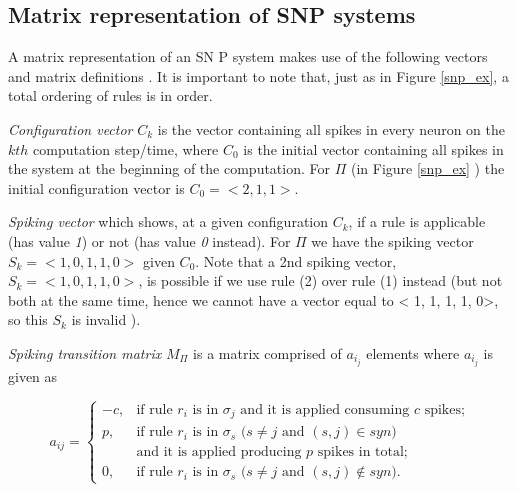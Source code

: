 \documentclass{acm_proc_article-sp}
\begin{document}




\subsection{Matrix representation of SNP systems}
A matrix representation of an SN P system makes use of the
following vectors and matrix definitions \cite{snpbrain}\cite{snpmat} . It is important to note that, just as in Figure \ref{snp_ex}, a total ordering of rules is in
order.

\textit{Configuration vector} $C_k$ is the vector containing all spikes in every neuron on the $kth$ computation step/time, where $C_0$ is the initial vector containing all spikes in the system at the beginning of the computation. For $\Pi$ (in Figure \ref{snp_ex} ) the initial configuration vector is $C_0 = < 2, 1, 1 >$.

\textit{Spiking vector} which shows, at a given configuration $C_k$, if a
rule is applicable (has value \textit{1}) or not (has value \textit{0} instead). For $\Pi$ we have the
spiking vector $S_k = < 1, 0, 1, 1, 0 >$ given $C_0$.
Note that a 2nd spiking vector, $S_k = < 1, 0, 1, 1, 0 >$, is
possible if we use rule (2) over rule (1) instead (but not both
at the same time, hence we cannot have a vector equal to
< 1, 1, 1, 1, 0>, so this $S_k$ is invalid ).

\textit{Spiking transition matrix} $M_{\Pi}$ is a matrix comprised of $a_i_j$
elements where $a_i_j$ is given as

\begin{definition}\label{defi-snp-mat}
$$
a_{ij} = \left\{
\begin{array}{rl}
-c, &\mbox{if rule $r_i$ is in $\sigma_j$ and it is applied consuming $c$ spikes;} \\
 p, &\mbox{if rule $r_i$ is in $\sigma_s$ ($s\neq j$ and $(s,j)\in syn$)} \\
 & \mbox{and it is applied producing $p$ spikes in total;}\\
 0, &\mbox{if rule $r_i$ is in $\sigma_s$ ($s\neq j$ and $(s,j)\notin syn$).}
    \end{array}
\right.
$$
\end{definition}
\end{document}
